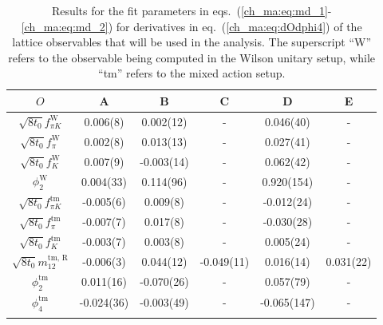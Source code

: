 \begin{longtable}{c | c c c c c}
\label{ch_ma:tab:md}
    ${O}$ & A & B & C & D & E \\
    \toprule
    $\sqrt{8t_0}f_{\pi K}^{\textrm{W}}$ & 0.006(8) & 0.002(12) & - & 0.046(40) & - \\ 
    $\sqrt{8t_0}f_{\pi}^{\textrm{W}}$ & 0.002(8) & 0.013(13) & - & 0.027(41) & - \\ 
    $\sqrt{8t_0}f_{K}^{\textrm{W}}$ & 0.007(9) & -0.003(14) & - & 0.062(42) & - \\ 
    $\phi_2^{\textrm{W}}$ & 0.004(33) & 0.114(96) & - & 0.920(154) & - \\ 
    \midrule
    $\sqrt{8t_0}f_{\pi K}^{\textrm{tm}}$ & -0.005(6) & 0.009(8) & - & -0.012(24) & - \\ 
    $\sqrt{8t_0}f_{\pi}^{\textrm{tm}}$ & -0.007(7) & 0.017(8) & - & -0.030(28) & - \\ 
    $\sqrt{8t_0}f_{K}^{\textrm{tm}}$ & -0.003(7) & 0.003(8) & - & 0.005(24) & - \\ 
    $\sqrt{8t_0}m_{12}^{\textrm{tm, R}}$ & -0.006(3) & 0.044(12) & -0.049(11) & 0.016(14) & 0.031(22) \\ 
    $\phi_2^{\textrm{tm}}$ & 0.011(16) & -0.070(26) & - & 0.057(79) & - \\ 
    $\phi_4^{\textrm{tm}}$ & -0.024(36) & -0.003(49) & - & -0.065(147) & - \\ 
    \bottomrule
    \caption{Results for the fit parameters in eqs.~(\ref{ch_ma:eq:md_1}-\ref{ch_ma:eq:md_2}) for derivatives in eq.~(\ref{ch_ma:eq:dOdphi4}) of the lattice observables that will be used in the analysis. The superscript ``W'' refers to the observable being computed in the Wilson unitary setup, while ``tm'' refers to the mixed action setup.}
\end{longtable}

